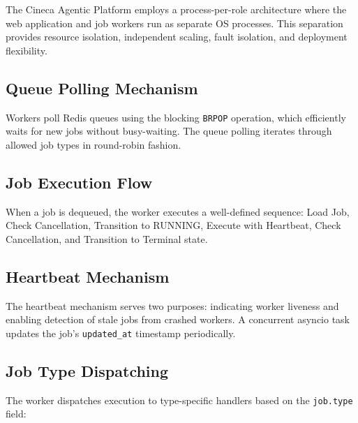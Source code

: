\documentclass[a4paper,twoside]{sapthesis}
\begin{document}
The Cineca Agentic Platform employs a process-per-role architecture where the web application and job workers run as separate OS processes. This separation provides resource isolation, independent scaling, fault isolation, and deployment flexibility.

\subsection{Queue Polling Mechanism}

Workers poll Redis queues using the blocking \texttt{BRPOP} operation, which efficiently waits for new jobs without busy-waiting. The queue polling iterates through allowed job types in round-robin fashion.

\subsection{Job Execution Flow}

When a job is dequeued, the worker executes a well-defined sequence: Load Job, Check Cancellation, Transition to RUNNING, Execute with Heartbeat, Check Cancellation, and Transition to Terminal state.

\subsection{Heartbeat Mechanism}

The heartbeat mechanism serves two purposes: indicating worker liveness and enabling detection of stale jobs from crashed workers. A concurrent asyncio task updates the job's \texttt{updated\_at} timestamp periodically.

\subsection{Job Type Dispatching}

The worker dispatches execution to type-specific handlers based on the \texttt{job.type} field:
\end{document}
